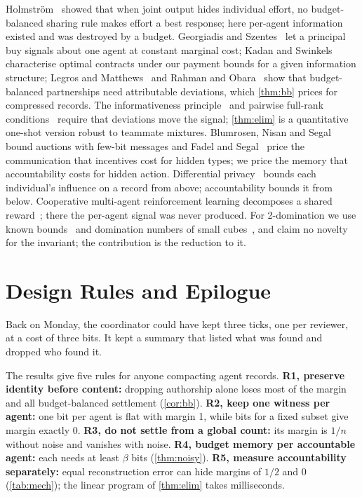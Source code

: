 \documentclass[sigconf,anonymous,acmthm=false]{acmart}
\theoremstyle{acmplain}
\theoremstyle{acmdefinition}
\begin{document}
Holmstr\"om~\cite{holmstrom1982teams} showed that when joint output hides individual
effort, no budget-balanced sharing rule makes effort a best response; here per-agent
information existed and was destroyed by a budget. Georgiadis and
Szentes~\cite{georgiadisszentes2020} let a principal buy signals about one agent at
constant marginal cost; Kadan and Swinkels~\cite{kadanswinkels2008} characterise optimal
contracts under our payment bounds for a given information structure; Legros and
Matthews~\cite{legrosmatthews1993} and Rahman and Obara~\cite{rahmanobara2010} show that
budget-balanced partnerships need attributable deviations, which \cref{thm:bb} prices for
compressed records. The informativeness principle~\cite{holmstrom1979moral} and pairwise
full-rank conditions~\cite{fudenberg1994folk} require that deviations move the signal;
\cref{thm:elim} is a quantitative one-shot version robust to teammate mixtures. Blumrosen,
Nisan and Segal~\cite{blumrosen2007auctions} bound auctions with few-bit messages and Fadel
and Segal~\cite{fadelsegal2009} price the communication that incentives cost for hidden
types; we price the memory that accountability costs for hidden action. Differential
privacy~\cite{dwork2006calibrating} bounds each individual's influence on a record from
above; accountability bounds it from below. Cooperative multi-agent reinforcement learning
decomposes a shared reward~\cite{foerster2018coma,sunehag2018vdn,rashid2018qmix,li2025nucleolus};
there the per-agent signal was never produced. For 2-domination we use known
bounds~\cite{fink1985ndomination,chellali2012survey,bujtas2016bounds} and domination numbers
of small cubes~\cite{ostergard2001length9}, and claim no novelty for the invariant; the
contribution is the reduction to it.

\section{Design Rules and Epilogue}\label{sec:design}

\begin{story}
Back on Monday, the coordinator could have kept three ticks, one per reviewer, at a cost of
three bits. It kept a summary that listed what was found and dropped who found it.
\end{story}

The results give five rules for anyone compacting agent records. \textbf{R1, preserve
identity before content:} dropping authorship alone loses most of the margin and all
budget-balanced settlement (\cref{cor:bb}). \textbf{R2, keep one witness per agent:} one bit
per agent is flat with margin 1, while bits for a fixed subset give margin exactly 0.
\textbf{R3, do not settle from a global count:} its margin is $1/n$ without noise and
vanishes with noise. \textbf{R4, budget memory per accountable agent:} each needs at least
$\beta$ bits (\cref{thm:noisy}). \textbf{R5, measure accountability separately:} equal
reconstruction error can hide margins of $1/2$ and $0$ (\cref{tab:mech}); the linear
program of \cref{thm:elim} takes milliseconds.
\end{document}
